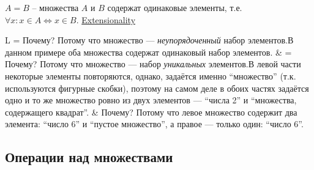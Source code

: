 \documentclass[a4paper,10pt]{article}
\begin{document}
\begin{terms}
    \item $A = B$ \--- множества $A$ и $B$ содержат одинаковые элементы, т.е. $\forall x : x \in A \iff x \in B$.
    \hfill\href{https://en.wikipedia.org/wiki/Axiom_of_extensionality}{Extensionality}
    \begin{terms}
        \item \begin{tabular}{\ML{4.5cm} \ML{4.5cm} L}
            \pdftooltip%
                { = }%
                {Почему? Потому что множество --- \emph{неупорядоченный} набор элементов.\textLF В данном примере оба множества содержат одинаковый набор элементов.}
            & \pdftooltip%
                { = }%
                {Почему? Потому что множество --- набор \emph{уникальных} элементов.\textLF В левой части некоторые элементы повторяются, однако, задаётся именно \enquote{множество} (т.к. используются фигурные скобки), поэтому на самом деле в обоих частях задаётся одно и то же множество ровно из двух элементов --- \enquote{числа 2} и \enquote{множества, содержащего квадрат}.}
            & \pdftooltip%
                { \neq {}}%
                {Почему? Потому что левое множество содержит два элемента: \enquote{число 6} и \enquote{пустое множество}, а правое --- только один: \enquote{число 6}.}
        \end{tabular}
    \end{terms}
\end{terms}


\subsection{Операции над множествами}
\end{document}

